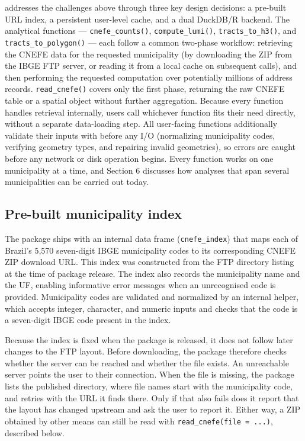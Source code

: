  addresses the challenges above through three key design
decisions: a pre-built URL index, a persistent user-level cache, and a
dual DuckDB/R backend. The analytical functions --- \texttt{cnefe\_counts()},
\texttt{compute\_lumi()}, \texttt{tracts\_to\_h3()}, and \texttt{tracts\_to\_polygon()} --- each
follow a common two-phase workflow: retrieving the CNEFE data for the
requested municipality (by downloading the ZIP from the IBGE FTP server,
or reading it from a local cache on subsequent calls), and then performing
the requested computation over potentially millions of address records.
\texttt{read\_cnefe()} covers only the first phase, returning the raw CNEFE table
or a spatial object without further aggregation. Because every function
handles retrieval internally, users call whichever function fits their
need directly, without a separate data-loading step. All user-facing
functions additionally validate their inputs with 
\citep{lang2017} before any I/O (normalizing municipality codes, verifying
geometry types, and repairing invalid geometries), so errors are caught
before any network or disk operation begins. Every function works on one
municipality at a time, and Section 6 discusses how analyses that span
several municipalities can be carried out today.

\subsection{Pre-built municipality index}\label{pre-built-municipality-index}

The package ships with an internal data frame (\texttt{cnefe\_index}) that maps
each of Brazil's 5,570 seven-digit IBGE municipality codes to its
corresponding CNEFE ZIP download URL. This index was constructed from
the FTP directory listing at the time of package release. The index also
records the municipality name and the UF, enabling
informative error messages when an unrecognised code is provided.
Municipality codes are validated and normalized by an internal helper,
which accepts integer, character, and numeric inputs and checks that the
code is a seven-digit IBGE code present in the index.

Because the index is fixed when the package is released, it does not
follow later changes to the FTP layout. Before downloading, the package
therefore checks whether the server can be reached and whether the file
exists. An unreachable server points the user to their connection. When
the file is missing, the package lists the published directory, where
file names start with the municipality code, and retries with the URL it
finds there. Only if that also fails does it report that the layout has
changed upstream and ask the user to report it. Either way, a ZIP
obtained by other means can still be read with \texttt{read\_cnefe(file\ =\ ...)},
described below.

